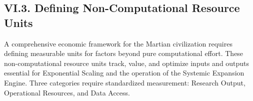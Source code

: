 \documentclass[fontsize=10pt, oneside, DIV=calc]{scrartcl}
\begin{document}
\begin{comment}
@startuml
!theme cloudscape-design
scale 1.6

skinparam defaultFontColor black
skinparam backgroundColor white


scale 1.4

title ``Comp. Unit Definition Process\nMartian Economy''

skinparam component {
  BorderColor black
  FontColor black
  shadowing 0
  FontSize 12
}
skinparam arrow {
  Color black
}

component ``Raw Capacity\nDiverse Hardware'' as Raw
component ``Benchmarking'' as Bench
component ``Workload Model\n(AWQM)'' as Model
component ``Comp. Unit\n(CU)'' as CU
component ``Processing Hour\nEq. (PHE)'' as PHE
component ``Martian Economy'' as Economy

component ``Dynamic Unit\nValuation'' as Dynamic
component ``Energy\nAwareness'' as Energy

Raw -down-> Bench
Raw -down-> Model

Bench -down-> Model : ``Informs''

Model -down-> CU : ``Defines''
Model -down-> PHE : ``Defines''

CU -down-> Economy : ``Used In''
PHE -down-> Economy : ``Used In''

Energy -right-> Model : ``Influences\nMetric''
Dynamic -left-> Economy : ``Influences\nValue''
Energy -left-> Economy : ``Influences\nCost''

@enduml
\end{comment}





\subsection*{VI.3. Defining Non-Computational Resource Units}



\medskip

\noindent
A comprehensive economic framework for the Martian civilization requires defining measurable units for factors beyond pure computational effort. These non-computational resource units track, value, and optimize inputs and outputs essential for Exponential Scaling and the operation of the Systemic Expansion Engine. Three categories require standardized measurement: Research Output, Operational Resources, and Data Access.
\end{document}
